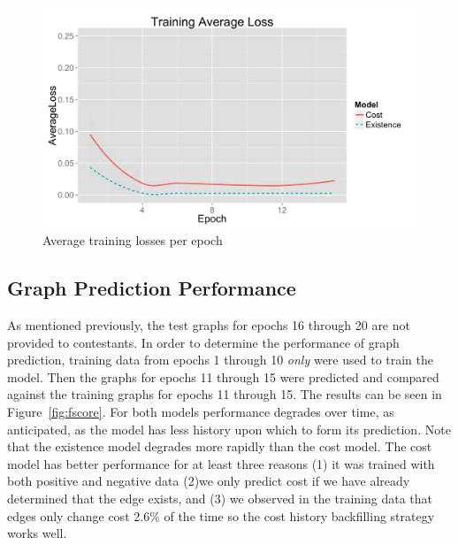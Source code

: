 \documentclass{article} %
\begin{document}
\begin{figure}
  \begin{center}
    \includegraphics[scale=.1]{trainingAverageLoss.png}
  \end{center}
  \caption{Average training losses per epoch}
  \label{fig:avgloss}
\end{figure}

\subsection{Graph Prediction Performance}

As mentioned previously, the test graphs for epochs 16 through 20 are not
provided to contestants.  In order to determine the performance of graph
prediction, training data from epochs 1 through 10 \emph{only} were used to
train the model.  Then the graphs for epochs 11 through 15 were predicted
and compared against the training graphs for epochs 11 through 15.  The
results can be seen in Figure~\ref{fig:fscore}.  For both models performance
degrades over time, as anticipated, as the model has less history upon which
to form its prediction.  Note that the existence model degrades more rapidly
than the cost model.  The cost model has better performance for at least
three reasons (1) it was trained with both positive and negative data (2)we
only predict cost if we have already determined that the edge exists, and
(3) we observed in the training data that edges only change cost 2.6\% of
the time so the cost history backfilling strategy works well.
\end{document}
